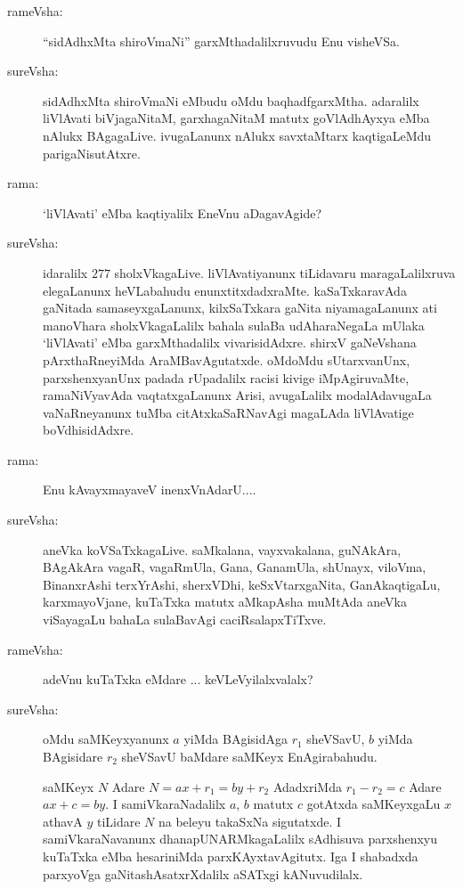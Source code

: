 \begin{description}
\item[rameVsha:] ``sidAdhxMta shiroVmaNi'' garxMthadalilxruvudu Enu visheVSa.

\item[sureVsha:] sidAdhxMta shiroVmaNi eMbudu oMdu baqhadfgarxMtha. adaralilx liVlAvati biVjagaNitaM, garxhagaNitaM matutx goVlAdhAyxya eMba nAlukx BAgagaLive. ivugaLanunx nAlukx savxtaMtarx kaqtigaLeMdu parigaNisutAtxre.

\item[rama:] `liVlAvati' eMba kaqtiyalilx EneVnu aDagavAgide?

\item[sureVsha:] idaralilx $277$ sholxVkagaLive. liVlAvatiyanunx tiLidavaru maragaLalilxruva elegaLanunx heVLabahudu enunxtitxdadxraMte. kaSaTxkaravAda gaNitada samaseyxgaLanunx, kilxSaTxkara gaNita niyamagaLanunx ati manoVhara sholxVkagaLalilx bahala sulaBa udAharaNegaLa mUlaka `liVlAvati' eMba garxMthadalilx vivarisidAdxre. shirxV gaNeVshana pArxthaRneyiMda AraMBavAgutatxde. oMdoMdu sUtarxvanUnx, parxshenxyanUnx padada rUpadalilx racisi kivige iMpAgiruvaMte, ramaNiVyavAda vaqtatxgaLanunx Arisi, avugaLalilx modalAdavugaLa vaNaRneyanunx tuMba citAtxkaSaRNavAgi magaLAda liVlAvatige boVdhisidAdxre.

\item[rama:] Enu kAvayxmayaveV inenxVnAdarU....

\item[sureVsha:] aneVka koVSaTxkagaLive. saMkalana, vayxvakalana, guNAkAra, BAgAkAra vagaR, vagaRmUla, Gana, GanamUla, shUnayx, viloVma, BinanxrAshi terxYrAshi, sherxVDhi, keSxVtarxgaNita, GanAkaqtigaLu, karxmayoVjane, kuTaTxka matutx aMkapAsha muMtAda aneVka viSayagaLu bahaLa sulaBavAgi caciRsalapxTiTxve.

\item[rameVsha:] adeVnu kuTaTxka eMdare ... keVLeVyilalxvalalx?

\item[sureVsha:] oMdu saMKeyxyanunx $a$ yiMda BAgisidAga $r_{1}$ sheVSavU, $b$ yiMda BAgisidare $r_{2}$ sheVSavU baMdare saMKeyx EnAgirabahudu.

saMKeyx $N$ Adare $N=ax+r_{1}=by+r_{2}$ AdadxriMda $r_{1}-r_{2}=c$ Adare $ax+c=by$. I samiVkaraNadalilx $a$, $b$ matutx $c$ gotAtxda saMKeyxgaLu $x$ athavA $y$ tiLidare $N$ na beleyu takaSxNa sigutatxde. I samiVkaraNavanunx dhanapUNARMkagaLalilx sAdhisuva parxshenxyu kuTaTxka eMba hesariniMda parxKAyxtavAgitutx. Iga I shabadxda parxyoVga gaNitashAsatxrXdalilx aSATxgi kANuvudilalx.


\end{description}
